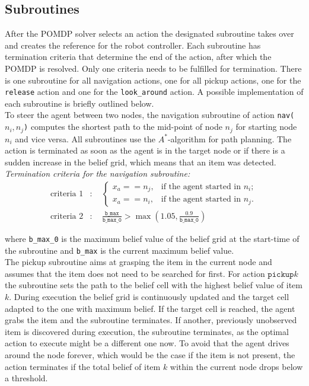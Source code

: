\subsection{Subroutines}\label{subsec:subroutine}
After the POMDP solver selects an action the designated subroutine takes over and creates the reference for the robot controller. Each subroutine has termination criteria that determine the end of the action, after which the POMDP is resolved. Only one criteria needs to be fulfilled for termination. There is one subroutine for all navigation actions, one for all pickup actions, one for the \texttt{release} action and one for the \texttt{look\_around} action. A possible implementation of each subroutine is briefly outlined below.\\

To steer the agent between two nodes, the navigation subroutine of action \texttt{nav($n_i, n_j$)} computes the shortest path to the mid-point of node $n_j$ for starting node $n_i$ and vice versa. All subroutines use the $A^*$-algorithm for path planning. The action is terminated as soon as the agent is in the target node or if there is a sudden increase in the belief grid, which means that an item was detected.\\

\textit{Termination criteria for the navigation subroutine:}
\begin{align}
    \text{criteria 1}&: \quad
    \begin{cases}x_a == n_j, &\text{if the agent started in }n_i;\\ 
    x_a == n_i, & \text{if the agent started in }n_j. \end{cases}\\
    \text{criteria 2}&:\quad \frac{\texttt{b\_max}}{\texttt{b\_max\_0}} > \max\left(1.05, \frac{0.9}{\texttt{b\_max\_0}}\right)
\end{align}

where \texttt{b\_max\_0} is the maximum belief value of the belief grid at the start-time of the subroutine and \texttt{b\_max} is the current maximum belief value.\\

The pickup subroutine aims at grasping the item in the current node and assumes that the item does not need to be searched for first. For action $\texttt{pickup}k$ the subroutine sets the path to the belief cell with the highest belief value of item $k$. During execution the belief grid is continuously updated and the target cell adapted to the one with maximum belief. If the target cell is reached, the agent grabs the item and the subroutine terminates. If another, previously unobserved item is discovered during execution, the subroutine terminates, as the optimal action to execute might be a different one now. To avoid that the agent drives around the node forever, which would be the case if the item is not present, the action terminates if the total belief of item $k$ within the current node drops below a threshold.\\

